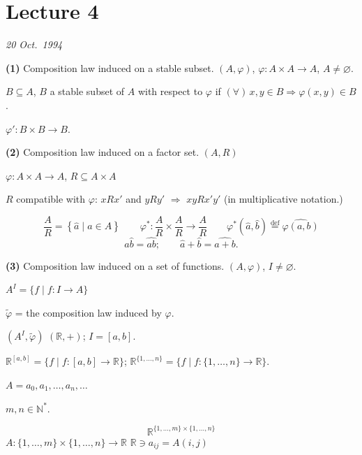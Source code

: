 \bigskip
\section{Lecture 4}

\begin{center}
\end{center}
\begin{flushright}
\textit{20 Oct.\ 1994}
\end{flushright}

\bigskip
\noindent\textbf{(1)} Composition law induced on a stable subset. $(A,\varphi)$, $\varphi : A\times A \to A$, $A\neq\varnothing$.

\noindent $B\subseteq A$, $B$ a stable subset of $A$ with respect to $\varphi$ if $(\forall)\,x,y\in B \Rightarrow \varphi(x,y)\in B$.

\noindent $\varphi' : B\times B \to B$.

\bigskip
\noindent\textbf{(2)} Composition law induced on a factor set. $(A,R)$

\noindent $\varphi : A\times A \to A$, \quad $R\subseteq A\times A$

\noindent $R$ compatible with $\varphi$: \quad $xRx'$ and $yRy'$ $\Rightarrow$ $xyRx'y'$ (in multiplicative notation.)

\[
\frac{A}{R} = \left\{\hat a \mid a\in A\right\} \qquad \varphi^* : \frac{A}{R}\times\frac{A}{R} \to \frac{A}{R} \qquad \varphi^*(\hat a,\hat b) \overset{\text{def}}{=} \widehat{\varphi(a,b)}
\]
\[
\hat a\hat b = \widehat{ab}; \qquad \hat a + \hat b = \widehat{a+b}.
\]

\bigskip
\noindent\textbf{(3)} Composition law induced on a set of functions. $(A,\varphi)$, $I\neq\varnothing$.

\noindent $A^I = \{f \mid f:I\to A\}$

\noindent $\tilde\varphi$ = the composition law induced by $\varphi$.

\noindent $(A^I,\tilde\varphi)$ \qquad $(\mathbb{R},+)$; $I=[a,b]$.

\noindent $\mathbb{R}^{[a,b]} = \{f \mid f:[a,b]\to\mathbb{R}\}$; \qquad $\mathbb{R}^{\{1,\ldots,n\}} = \{f \mid f:\{1,\ldots,n\}\to\mathbb{R}\}$.

\medskip
\noindent $A = a_0,a_1,\ldots,a_n,\ldots$

\noindent $m,n\in\mathbb{N}^*$.

\[
\mathbb{R}^{\{1,\ldots,m\}\times\{1,\ldots,n\}}
\]
\noindent $A : \{1,\ldots,m\}\times\{1,\ldots,n\} \to \mathbb{R}$ \hfill $\mathbb{R}\ni a_{ij} = A(i,j)$

